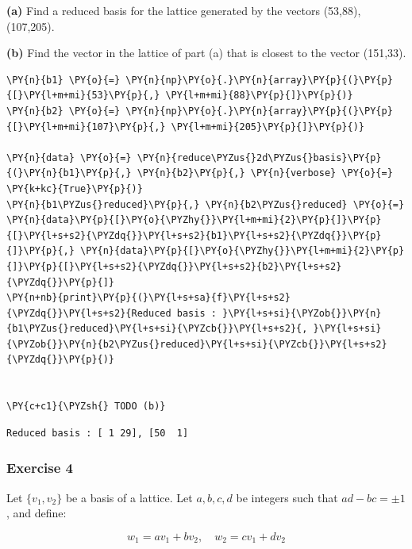 \documentclass[a4paper,12pt]{article}
\begin{document}
\textbf{(a)} Find a reduced basis for the lattice generated by the
vectors (53,88), (107,205).

\textbf{(b)} Find the vector in the lattice of part (a) that is closest
to the vector (151,33).

    \begin{tcolorbox}[breakable, size=fbox, boxrule=1pt, pad at break*=1mm,colback=cellbackground, colframe=cellborder]
\begin{Verbatim}[commandchars=\\\{\}]
\PY{n}{b1} \PY{o}{=} \PY{n}{np}\PY{o}{.}\PY{n}{array}\PY{p}{(}\PY{p}{[}\PY{l+m+mi}{53}\PY{p}{,} \PY{l+m+mi}{88}\PY{p}{]}\PY{p}{)}
\PY{n}{b2} \PY{o}{=} \PY{n}{np}\PY{o}{.}\PY{n}{array}\PY{p}{(}\PY{p}{[}\PY{l+m+mi}{107}\PY{p}{,} \PY{l+m+mi}{205}\PY{p}{]}\PY{p}{)}

\PY{n}{data} \PY{o}{=} \PY{n}{reduce\PYZus{}2d\PYZus{}basis}\PY{p}{(}\PY{n}{b1}\PY{p}{,} \PY{n}{b2}\PY{p}{,} \PY{n}{verbose} \PY{o}{=} \PY{k+kc}{True}\PY{p}{)}
\PY{n}{b1\PYZus{}reduced}\PY{p}{,} \PY{n}{b2\PYZus{}reduced} \PY{o}{=} \PY{n}{data}\PY{p}{[}\PY{o}{\PYZhy{}}\PY{l+m+mi}{2}\PY{p}{]}\PY{p}{[}\PY{l+s+s2}{\PYZdq{}}\PY{l+s+s2}{b1}\PY{l+s+s2}{\PYZdq{}}\PY{p}{]}\PY{p}{,} \PY{n}{data}\PY{p}{[}\PY{o}{\PYZhy{}}\PY{l+m+mi}{2}\PY{p}{]}\PY{p}{[}\PY{l+s+s2}{\PYZdq{}}\PY{l+s+s2}{b2}\PY{l+s+s2}{\PYZdq{}}\PY{p}{]}
\PY{n+nb}{print}\PY{p}{(}\PY{l+s+sa}{f}\PY{l+s+s2}{\PYZdq{}}\PY{l+s+s2}{Reduced basis : }\PY{l+s+si}{\PYZob{}}\PY{n}{b1\PYZus{}reduced}\PY{l+s+si}{\PYZcb{}}\PY{l+s+s2}{, }\PY{l+s+si}{\PYZob{}}\PY{n}{b2\PYZus{}reduced}\PY{l+s+si}{\PYZcb{}}\PY{l+s+s2}{\PYZdq{}}\PY{p}{)}


\PY{c+c1}{\PYZsh{} TODO (b)}
\end{Verbatim}
\end{tcolorbox}

    \begin{Verbatim}[commandchars=\\\{\}]
Reduced basis : [ 1 29], [50  1]
    \end{Verbatim}

\newpage
 \subsubsection{Exercise 4}\label{exercise-4}

Let \(\{v_1, v_2\}\) be a basis of a lattice. Let \(a, b, c, d\) be
integers such that \(ad - bc = \pm 1\), and define:

\[
w_1 = a v_1 + b v_2, \quad w_2 = c v_1 + d v_2
\]
\end{document}
